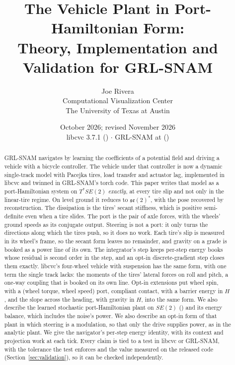 \documentclass[11pt]{article}
\title{\bfseries The Vehicle Plant in Port-Hamiltonian Form:\\
Theory, Implementation and Validation for GRL-SNAM}
\author{Joe Rivera\\
\normalsize Computational Visualization Center\\
\normalsize The University of Texas at Austin}
\date{October 2026; revised November 2026\\[2pt]
\small libcvc 3.7.1 (\code{transfix/libcvc}) $\cdot$ GRL-SNAM \code{main} at \code{0e21085}
(\code{CVC-Lab/GRL-SNAM})}
\theoremstyle{remark}
\newcommand{\se}{\mathfrak{se}(2)}
\begin{document}
\maketitle

\begin{abstract}
GRL-SNAM navigates by learning the coefficients of a potential field and driving a vehicle with
a bicycle controller. The vehicle under that controller is now a dynamic single-track model with
Pacejka tires, load transfer and actuator lag, implemented in libcvc and twinned in GRL-SNAM's
torch code. This paper writes that model as a port-Hamiltonian system on $T^*SE(2)$
\emph{exactly}, at every tire slip and not only in the linear-tire regime. On level ground it
reduces to $\se^*$, with the pose recovered by reconstruction. The dissipation is the
tires' secant stiffness, which is positive semi-definite even when a tire slides. The port is
the pair of axle forces, with the wheels' ground speeds as its conjugate output. Steering is not a
port: it only turns the directions along which the tires push, so it does no work. Each tire's
slip is measured in its wheel's frame, so the secant form leaves no remainder, and gravity on a
grade is booked as a power line of its own. The integrator's step keeps per-step energy books whose residual is second order in the
step, and an opt-in discrete-gradient step closes them exactly. libcvc's four-wheel vehicle with suspension has the same form, with one term the single
track lacks: the moments of the tires' lateral forces on roll and pitch, a one-way coupling that is
booked on its own line. Opt-in extensions put wheel spin, with a (wheel torque, wheel speed) port,
compliant contact, with a barrier energy in $H$, and the slope across the heading, with gravity in
$H$, into the same form. We also describe the learned stochastic port-Hamiltonian plant on $SE(2)$ ()
and its energy balance, which includes the noise's power. We also describe an opt-in form of that
plant in which steering is a modulation, so that only the drive supplies power, as in the analytic
plant. We give the navigator's per-step energy
identity, with its context and projection work at each tick. Every claim is tied to a test in
libcvc or GRL-SNAM, with the tolerance the test enforces and the value measured on the released
code (Section~\ref{sec:validation}), so it can be checked independently.
\end{abstract}

\tableofcontents

\end{document}
